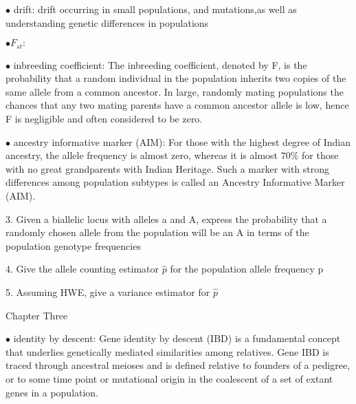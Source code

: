 \documentclass{article}
\begin{document}
\vspace{1pc}
$\bullet$ drift:
drift occurring in small populations, and mutations,as well as understanding genetic differences in populations

\vspace{1pc}
$\bullet  F_{st}:$ 


\vspace{1pc}
$\bullet$ inbreeding coefficient:
The inbreeding coefficient, denoted by F, is the
probability that a random individual in the population inherits two copies of the
same allele from a common ancestor. In large, randomly mating populations the
chances that any two mating parents have a common ancestor allele is low, hence F
is negligible and often considered to be zero.

\vspace{1pc}
$\bullet$ ancestry informative marker (AIM):
For those with the highest degree of Indian ancestry, the allele frequency
is almost zero, whereas it is almost $70\% $ for those with no great grandparents with
Indian Heritage. Such a marker with strong differences among population subtypes
is called an Ancestry Informative Marker (AIM).



\vspace{2pc}
3. Given a biallelic locus with alleles a and A, express the probability that a
randomly chosen allele from the population will be an A in terms of the
population genotype frequencies


\vspace{2pc}
4. Give the allele counting estimator $\hat{p}$ for the population allele frequency p


\vspace{2pc}
5. Assuming HWE, give a variance estimator for $\hat{p} $



\newpage
\centerline{\sc Chapter Three}


\vspace{1pc}
$\bullet$ identity by descent:
Gene identity by descent (IBD) is a fundamental concept that underlies genetically mediated similarities among relatives. Gene IBD is traced through ancestral meioses and is defined relative to founders of a pedigree, or to some time point or mutational origin in the coalescent of a set of extant genes in a population.
\end{document}
